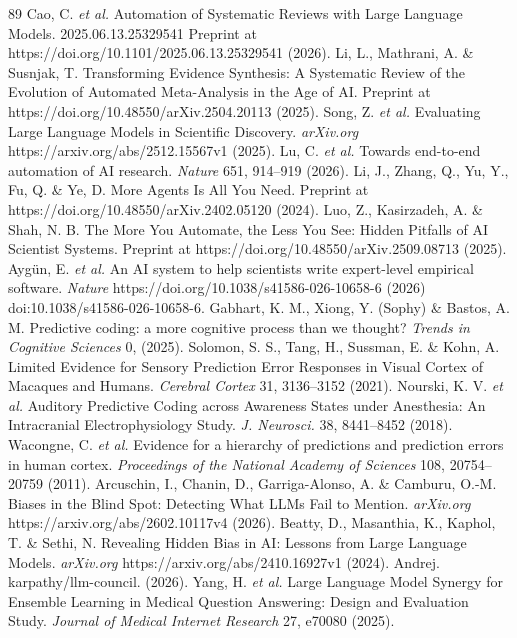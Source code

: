 \documentclass[12pt]{article}
\begin{document}
\begin{thebibliography}{89}
 Cao, C. \emph{et al.} Automation of Systematic Reviews with Large Language Models. 2025.06.13.25329541 Preprint at https://doi.org/10.1101/2025.06.13.25329541 (2026).
 Li, L., Mathrani, A. \& Susnjak, T. Transforming Evidence Synthesis: A Systematic Review of the Evolution of Automated Meta-Analysis in the Age of AI. Preprint at https://doi.org/10.48550/arXiv.2504.20113 (2025).
 Song, Z. \emph{et al.} Evaluating Large Language Models in Scientific Discovery. \emph{arXiv.org} https://arxiv.org/abs/2512.15567v1 (2025).
 Lu, C. \emph{et al.} Towards end-to-end automation of AI research. \emph{Nature} 651, 914--919 (2026).
 Li, J., Zhang, Q., Yu, Y., Fu, Q. \& Ye, D. More Agents Is All You Need. Preprint at https://doi.org/10.48550/arXiv.2402.05120 (2024).
 Luo, Z., Kasirzadeh, A. \& Shah, N. B. The More You Automate, the Less You See: Hidden Pitfalls of AI Scientist Systems. Preprint at https://doi.org/10.48550/arXiv.2509.08713 (2025).
 Aygün, E. \emph{et al.} An AI system to help scientists write expert-level empirical software. \emph{Nature} https://doi.org/10.1038/s41586-026-10658-6 (2026) doi:10.1038/s41586-026-10658-6.
 Gabhart, K. M., Xiong, Y. (Sophy) \& Bastos, A. M. Predictive coding: a more cognitive process than we thought? \emph{Trends in Cognitive Sciences} 0, (2025).
 Solomon, S. S., Tang, H., Sussman, E. \& Kohn, A. Limited Evidence for Sensory Prediction Error Responses in Visual Cortex of Macaques and Humans. \emph{Cerebral Cortex} 31, 3136--3152 (2021).
 Nourski, K. V. \emph{et al.} Auditory Predictive Coding across Awareness States under Anesthesia: An Intracranial Electrophysiology Study. \emph{J. Neurosci.} 38, 8441--8452 (2018).
 Wacongne, C. \emph{et al.} Evidence for a hierarchy of predictions and prediction errors in human cortex. \emph{Proceedings of the National Academy of Sciences} 108, 20754--20759 (2011).
 Arcuschin, I., Chanin, D., Garriga-Alonso, A. \& Camburu, O.-M. Biases in the Blind Spot: Detecting What LLMs Fail to Mention. \emph{arXiv.org} https://arxiv.org/abs/2602.10117v4 (2026).
 Beatty, D., Masanthia, K., Kaphol, T. \& Sethi, N. Revealing Hidden Bias in AI: Lessons from Large Language Models. \emph{arXiv.org} https://arxiv.org/abs/2410.16927v1 (2024).
 Andrej. karpathy/llm-council. (2026).
 Yang, H. \emph{et al.} Large Language Model Synergy for Ensemble Learning in Medical Question Answering: Design and Evaluation Study. \emph{Journal of Medical Internet Research} 27, e70080 (2025).

\end{thebibliography}
\end{document}
